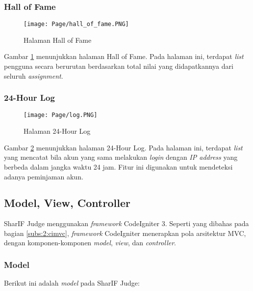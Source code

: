 \subsubsection{Hall of Fame}
    \begin{figure}[H]
    	\centering  
    	\texttt{[image: Page/hall\_of\_fame.PNG]}  
    	\caption{Halaman Hall of Fame}
    	\label{fig:3:hall_of_fame} 
    \end{figure} 
    
    Gambar \ref{fig:3:hall_of_fame} menunjukkan halaman Hall of Fame. Pada halaman ini, terdapat \textit{list} pengguna secara berurutan berdasarkan total nilai yang didapatkannya dari seluruh \textit{assignment}.

\subsubsection{24-Hour Log}
    \begin{figure}[H]
    	\centering  
    	\texttt{[image: Page/log.PNG]}  
    	\caption{Halaman 24-Hour Log}
    	\label{fig:3:log} 
    \end{figure} 
    
    Gambar \ref{fig:3:log} menunjukkan halaman 24-Hour Log. Pada halaman ini, terdapat \textit{list} yang mencatat bila akun yang sama melakukan \textit{login} dengan \textit{IP address} yang berbeda dalam jangka waktu 24 jam. Fitur ini digunakan untuk mendeteksi adanya peminjaman akun.

\subsection{Model, View, Controller}
\label{subs:3:mvc}
SharIF Judge menggunakan \textit{framework} CodeIgniter 3. Seperti yang dibahas pada bagian \ref{subs:2:cimvc}, \textit{framework} CodeIgniter menerapkan pola arsitektur MVC, dengan komponen-komponen \textit{model}, \textit{view}, dan \textit{controller}.

\subsubsection{Model}

Berikut ini adalah \textit{model} pada SharIF Judge:

